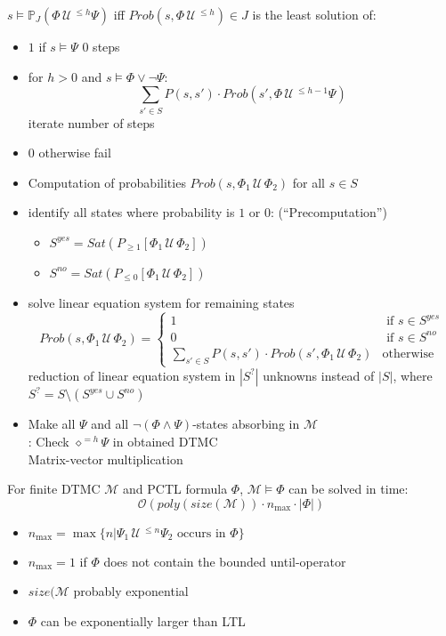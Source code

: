 \documentclass[a4paper, 10pt]{article}
\newcommand{\until}{\,\mathcal{U}\,}
\renewcommand{\O}{\mathcal{O}}
\begin{document}
\begin{mdframed}
$s\models\mathbb{P}_J(\Phi\until^{\leq h}\Psi)$ iff $Prob(s,\Phi\until^{\leq h})\in J$ is the least solution of:
\begin{itemize}
    \item $1$ if $s\models\Psi$ {\tiny 0 steps}
    \item for $h>0$ and $s\models\Phi\vee\neg\Psi:$
    \[\sum_{s'\in S}P(s,s')\cdot Prob(s',\Phi\until^{\leq h-1}\Psi) \] {\tiny iterate number of steps}
    \item $0$ otherwise {\tiny fail}
\end{itemize}
\begin{itemize}
    \item Computation of probabilities $Prob(s,\Phi_1\until\Phi_2)$ for all $s\in S$
    \item identify all states where probability is $1$ or $0$: (``Precomputation'')
    \begin{itemize}
        \item $S^{yes}=Sat(P_{\geq1}[\Phi_1\until\Phi_2])$
        \item $S^{no}=Sat(P_{\leq0}[\Phi_1\until\Phi_2])$
    \end{itemize}
    \item solve linear equation system for remaining states
    \[ Prob(s,\Phi_1\until\Phi_2)=
    \begin{cases}
        1 & \text{ if } s\in S^{yes} \\
        0 & \text{ if } s\in S^{no} \\
        \sum_{s'\in S}P(s,s')\cdot Prob(s',\Phi_1\until\Phi_2) & \text{otherwise}
    \end{cases}
     \]
     \follows reduction of linear equation system in $|S^?|$ unknowns instead of $|S|$, where $S^?=S\setminus(S^{yes}\cup S^{no})$
     \item Make all $\Psi$ and all $\neg(\Phi\wedge\Psi)$-states absorbing in $\mathcal{M}$
     \\ \follows: Check $\diamond^{=h}\Psi$ in obtained DTMC
     \\ \follows Matrix-vector multiplication
\end{itemize}
For finite DTMC $\mathcal{M}$ and PCTL formula $\Phi$, $\mathcal{M}\models\Phi$ can be solved in time:
\[
\O(poly(size(\mathcal{M}))\cdot n_{\max}\cdot|\Phi|)
\]
\begin{itemize}
    \item $n_{\max}=\max\{n|\Psi_1\until^{\leq n}\Psi_2 \text{ occurs in }\Phi\}$
    \item $n_{\max}=1$ if $\Phi$ does not contain the bounded until-operator
    \item $size(\mathcal{M}$ probably exponential
    \item $\Phi$ can be exponentially larger than LTL
\end{itemize}
\end{mdframed}
\end{document}
